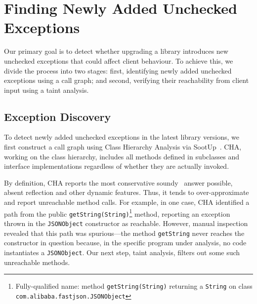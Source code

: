 \section{Finding Newly Added Unchecked Exceptions}

Our primary goal is to detect whether upgrading a library introduces new unchecked exceptions that could affect client behaviour. To achieve this, we divide the process into two stages: first, identifying newly added unchecked exceptions using a call graph; and second, verifying their reachability from client input using a taint analysis.

\subsection{Exception Discovery}

To detect newly added unchecked exceptions in the latest library versions, we first construct a call graph using Class Hierarchy Analysis via SootUp~\cite{Karakaya24:_SootUp}. CHA, working on the class hierarchy, includes all methods defined in subclasses and interface implementations regardless of whether they are actually invoked.


By definition, CHA reports the most conservative soundy~\cite{livshits15:_in} answer possible, absent reflection and other dynamic features. Thus, it tends to over-approximate and report unreachable method calls. For example, in one case, CHA identified a path from the public \texttt{getString(String)}\footnote{Fully-qualified name: method \texttt{getString(String)} returning a \texttt{String} on class \texttt{com.alibaba.fastjson.JSONObject}} method, reporting an exception thrown in the \texttt{JSONObject} constructor as reachable. However, manual inspection revealed that this path was spurious—the method \texttt{getString} never reaches the constructor in question because, in the specific program under analysis, no code instantiates a \texttt{JSONObject}. Our next step, taint analysis, filters out some such unreachable methods.


